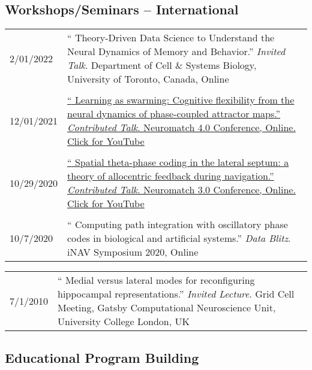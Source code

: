 \documentclass[10pt]{article}
\newcommand{\itemtitle}[1]{{\color{hopkinsblue}\ul{#1}}}
\newcommand{\unpubtitle}[1]{{\color{hopkinsblue} #1}}
\begin{document}
\subsection*{Workshops/Seminars -- International}

\begin{tabular}{@{\hspace{0.2in}}l>{\raggedright\arraybackslash}p{}}
  2/01/2022 \hspace{0.2in} & ``\unpubtitle{Theory-Driven Data Science to
    Understand the Neural Dynamics of Memory and Behavior}.'' \emph{Invited Talk}.
    Department of Cell \& Systems Biology, University of Toronto, Canada, Online \\
  \tabularnewline
  12/01/2021 \hspace{0.2in} &
  \href{https://youtu.be/3mKkLksOyfk}{``\unpubtitle{Learning as swarming:
      Cognitive flexibility from the neural dynamics of phase-coupled attractor
    maps}.'' \emph{Contributed Talk}. Neuromatch 4.0 Conference, Online.
  \itemtitle{Click for YouTube}}\\
  \tabularnewline
  10/29/2020 \hspace{0.2in} &
  \href{https://www.youtube.com/watch?v=WwYDMpD7j4Q}{``\unpubtitle{Spatial
      theta-phase coding in the lateral septum: a theory of allocentric feedback
    during navigation}.'' \emph{Contributed Talk}. Neuromatch 3.0 Conference,
  Online. \itemtitle{Click for YouTube}}\\
  \tabularnewline
  10/7/2020 \hspace{0.2in} & ``\unpubtitle{Computing path integration with
  oscillatory phase codes in biological and artificial systems}.'' \emph{Data
  Blitz}. iNAV Symposium 2020, Online\\
\end{tabular}

\pagebreak

\begin{tabular}{@{\hspace{0.2in}}l>{\raggedright\arraybackslash}p{}}
  7/1/2010 \hspace{0.2in} & ``\unpubtitle{Medial versus lateral modes for
  reconfiguring hippocampal representations}.'' \emph{Invited Lecture}. Grid
  Cell Meeting, Gatsby Computational Neuroscience Unit, University College
  London, UK\\
\end{tabular}

\smallskip
\subsection*{Educational Program Building}
\end{document}
